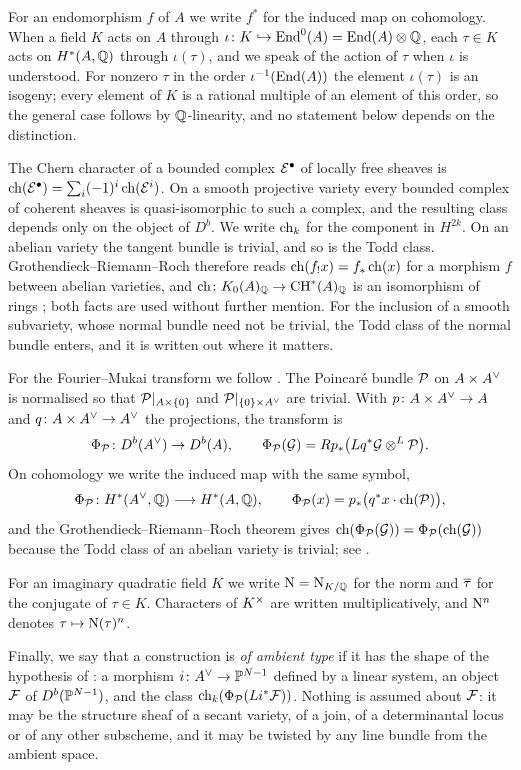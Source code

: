 For an endomorphism $f$ of $A$ we write $f^{*}$ for the induced map on
cohomology. When a field $K$ acts on $A$ through
$\iota\colon K\hookrightarrow\operatorname{End}^{0}(A)=\operatorname{End}(A)\otimes\mathbb{Q}$, each $\tau\in K$
acts on $H^{*}(A,\mathbb{Q})$ through $\iota(\tau)$, and we speak of the action of
$\tau$ when $\iota$ is understood. For nonzero $\tau$ in the order
$\iota^{-1}(\operatorname{End}(A))$ the element $\iota(\tau)$ is an isogeny; every element
of $K$ is a rational multiple of an element of this order, so the general
case follows by $\mathbb{Q}$-linearity, and no statement below depends on the
distinction.

The Chern character of a bounded complex $\mathcal{E}^{\bullet}$ of locally free
sheaves is $\operatorname{ch}(\mathcal{E}^{\bullet})=\sum_{i}(-1)^{i}\operatorname{ch}(\mathcal{E}^{i})$. On a smooth
projective variety every bounded complex of coherent sheaves is
quasi-isomorphic to such a complex, and the resulting class depends only on
the object of $D^{b}$. We write $\operatorname{ch}_{k}$ for the component in $H^{2k}$.
On an abelian variety the tangent bundle is trivial, and so is the Todd
class. Grothendieck--Riemann--Roch therefore reads
$\operatorname{ch}(f_{!}x)=f_{*}\operatorname{ch}(x)$ for a morphism $f$ between abelian varieties, and
$\operatorname{ch}\colon K_{0}(A)_{\mathbb{Q}}\to\operatorname{CH}^{*}(A)_{\mathbb{Q}}$ is an isomorphism of rings
\cite[Chapter~15]{Ful98}; both facts are used without further mention. For
the inclusion of a smooth subvariety, whose normal bundle need not be
trivial, the Todd class of the normal bundle enters, and it is written out
where it matters.

For the Fourier--Mukai transform we follow \cite{Muk81}. The Poincar\'e bundle
$\mathcal{P}$ on $A\times A^{\vee}$ is normalised so that $\mathcal{P}|_{A\times\{0\}}$ and
$\mathcal{P}|_{\{0\}\times A^{\vee}}$ are trivial. With $p\colon A\times A^{\vee}\to A$ and
$q\colon A\times A^{\vee}\to A^{\vee}$ the projections, the transform is
\[
  \Phi_{\mathcal{P}}\colon D^{b}(A^{\vee})\to D^{b}(A),
  \qquad
  \Phi_{\mathcal{P}}(\mathcal{G})=Rp_{*}\bigl(Lq^{*}\mathcal{G}\otimes^{L}\mathcal{P}\bigr).
\]
On cohomology we write the induced map with the same symbol,
\[
  \Phi_{\mathcal{P}}\colon H^{*}(A^{\vee},\mathbb{Q})\longrightarrow H^{*}(A,\mathbb{Q}),
  \qquad
  \Phi_{\mathcal{P}}(x)=p_{*}\bigl(q^{*}x\cdot\operatorname{ch}(\mathcal{P})\bigr),
\]
and the Grothendieck--Riemann--Roch theorem gives
$\operatorname{ch}(\Phi_{\mathcal{P}}(\mathcal{G}))=\Phi_{\mathcal{P}}(\operatorname{ch}(\mathcal{G}))$ because the Todd class of an
abelian variety is trivial; see .

For an imaginary quadratic field $K$ we write $\mathrm{N}=\mathrm{N}_{K/\mathbb{Q}}$ for the norm
and $\overline{\tau}$ for the conjugate of $\tau\in K$. Characters of $K^{\times}$ are
written multiplicatively, and $\mathrm{N}^{n}$ denotes $\tau\mapsto\mathrm{N}(\tau)^{n}$.

Finally, we say that a construction is \emph{of ambient type} if it has the
shape of the hypothesis of : a morphism
$i\colon A^{\vee}\to\mathbb{P}^{N-1}$ defined by a linear system, an object $\mathcal{F}$ of
$D^{b}(\mathbb{P}^{N-1})$, and the class $\operatorname{ch}_{k}(\Phi_{\mathcal{P}}(Li^{*}\mathcal{F}))$. Nothing is
assumed about $\mathcal{F}$: it may be the structure sheaf of a secant variety, of a
join, of a determinantal locus or of any other subscheme, and it may be
twisted by any line bundle from the ambient space.
